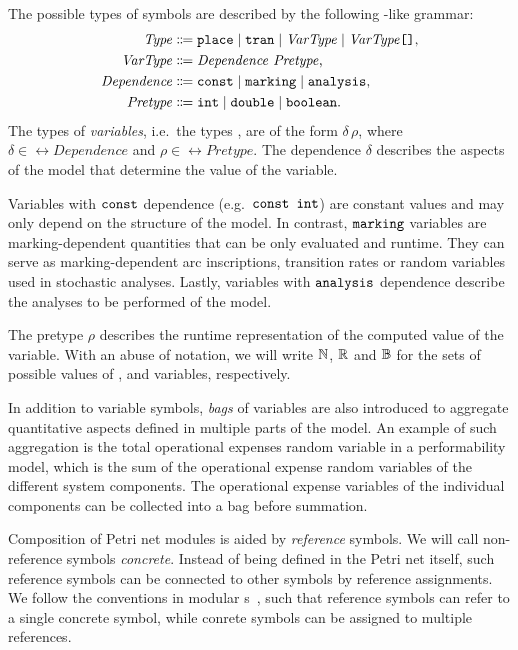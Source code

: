 The possible types of symbols are described by the following -like grammar:
\begin{equation}
  \begin{aligned}
    \ebnfVar{Type} &\ebnfEq \lit{place} \mid \lit{tran} \mid \ebnfVar{VarType} \mid \bagtype{\ebnfVar{VarType}} \text, \\
    \ebnfVar{VarType} &\ebnfEq \ebnfVar{Dependence}\ \ebnfVar{Pretype} \text,\\
    \rel{Dependence} &\ebnfEq \lit{const} \mid \lit{marking} \mid \lit{analysis}\text, \\
    \ebnfVar{Pretype} &\ebnfEq \lit{int} \mid \lit{double} \mid \lit{boolean} \text.
  \end{aligned}
\end{equation}
The types of \emph{variables}, i.e.~the types , are of the form \(\delta\, \rho\), where \(\delta \in \rel{Dependence}\) and \(\rho \in \rel{Pretype}\). The dependence \(\delta\) describes the aspects of the model that determine the value of the variable.

Variables with \(\texttt{\upshape const}\) dependence (e.g.~\(\texttt{\upshape const int}\)) are constant values and may only depend on the structure of the model. In contrast, \(\texttt{\upshape marking}\) variables are marking-dependent quantities that can be only evaluated and runtime. They can serve as marking-dependent arc inscriptions, transition rates or random variables used in stochastic analyses. Lastly, variables with \(\texttt{\upshape analysis}\) dependence describe the analyses to be performed of the model.

The pretype \(\rho\) describes the runtime representation of the computed value of the variable. With an abuse of notation, we will write \(\mathbb{N}\), \(\mathbb{R}\) and \(\mathbb{B}\) for the sets of possible values of ,  and  variables, respectively.

In addition to variable symbols, \emph{bags} of variables are also introduced to aggregate quantitative aspects defined in multiple parts of the model. An example of such aggregation is the total operational expenses random variable in a performability model, which is the sum of the operational expense random variables of the different system components. The operational expense variables of the individual components can be collected into a bag before summation.

Composition of Petri net modules is aided by \emph{reference} symbols. We will call non-reference symbols \emph{concrete}. Instead of being defined in the Petri net itself, such reference symbols can be connected to other symbols by reference assignments. We follow the conventions in modular s~\citep{Kindler01modular}, such that reference symbols can refer to a single concrete symbol, while conrete symbols can be assigned to multiple references.

